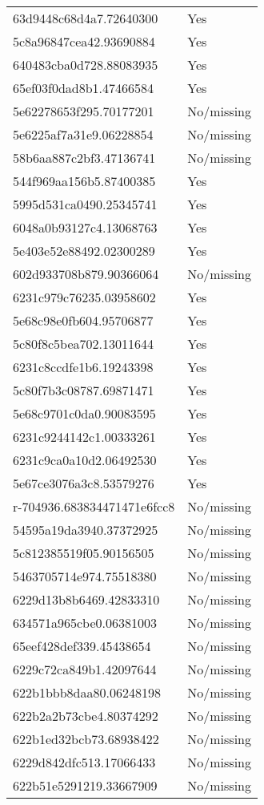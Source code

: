 \begin{tabular}{ll}
63d9448c68d4a7.72640300 & Yes \\
5c8a96847cea42.93690884 & Yes \\
640483cba0d728.88083935 & Yes \\
65ef03f0dad8b1.47466584 & Yes \\
5e62278653f295.70177201 & No/missing \\
5e6225af7a31e9.06228854 & No/missing \\
58b6aa887c2bf3.47136741 & No/missing \\
544f969aa156b5.87400385 & Yes \\
5995d531ca0490.25345741 & Yes \\
6048a0b93127c4.13068763 & Yes \\
5e403e52e88492.02300289 & Yes \\
602d933708b879.90366064 & No/missing \\
6231c979c76235.03958602 & Yes \\
5e68c98e0fb604.95706877 & Yes \\
5c80f8c5bea702.13011644 & Yes \\
6231c8ccdfe1b6.19243398 & Yes \\
5c80f7b3c08787.69871471 & Yes \\
5e68c9701c0da0.90083595 & Yes \\
6231c9244142c1.00333261 & Yes \\
6231c9ca0a10d2.06492530 & Yes \\
5e67ce3076a3c8.53579276 & Yes \\
r-704936.683834471471e6fcc8 & No/missing \\
54595a19da3940.37372925 & No/missing \\
5c812385519f05.90156505 & No/missing \\
5463705714e974.75518380 & No/missing \\
6229d13b8b6469.42833310 & No/missing \\
634571a965cbe0.06381003 & No/missing \\
65eef428def339.45438654 & No/missing \\
6229c72ca849b1.42097644 & No/missing \\
622b1bbb8daa80.06248198 & No/missing \\
622b2a2b73cbe4.80374292 & No/missing \\
622b1ed32bcb73.68938422 & No/missing \\
6229d842dfc513.17066433 & No/missing \\
622b51e5291219.33667909 & No/missing \\

\end{tabular}
